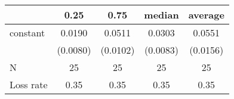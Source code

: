 \begin{tabular}{lcccc}
\hline
          &   0.25   &   0.75   &  median  & average   \\
\midrule
\midrule
constant  & 0.0190   & 0.0511   & 0.0303   & 0.0551    \\
          & (0.0080) & (0.0102) & (0.0083) & (0.0156)  \\
N         & 25       & 25       & 25       & 25        \\
Loss rate & 0.35     & 0.35     & 0.35     & 0.35      \\
\hline
\end{tabular}
